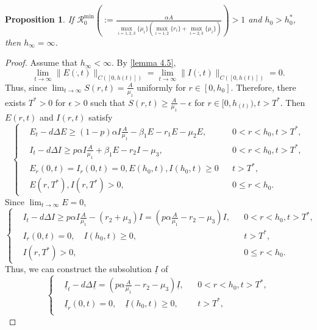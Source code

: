 \documentclass[11pt]{amsart}
\numberwithin{equation}{section}
\theoremstyle{plain}
\newtheorem{proposition}[theorem]{Proposition}
\theoremstyle{definition}
\begin{document}
\begin{proposition}
	If $\mathcal{R}_0^{\min}\left(:=\frac{\alpha A}{\max\limits_{i=1,2,3}\{\mu_i\}(\max\limits_{i=1,2}\{r_i\}+\max\limits_{i=2,3}\{\mu_i\})}\right)>1$ and $h_0>h_0^*$, then $h_\infty = \infty$.
\end{proposition}
\begin{proof}
	Assume that $h_\infty < \infty$. By \cref{lemma 4.5},
	\begin{equation*}
		\lim_{t \to \infty}\lVert E(\dot,t)\rVert_{C([0,h(t)])}=\lim_{t \to \infty}\lVert I(\dot,t)\rVert_{C([0,h(t)])}=0.
	\end{equation*}
	Thus, since $\displaystyle \lim_{t\to \infty}S(r,t)=\frac{A}{\mu_1}$ uniformly for $r \in [0,h_0]$. Therefore, there exists $T^*>0$ for $\epsilon>0$ such that $\displaystyle S(r,t) \geq \frac{A}{\mu_1}-\epsilon$ for $r\in [0,h_(t)), t>T^*$. Then $E(r,t)$ and $I(r,t)$ satisfy
	\begin{equation*}
		\left \{ \begin{aligned}
			&E_t-d\Delta E \geq (1-p)\alpha I \frac{A}{\mu_1}-\beta_1 E-r_1 E-\mu_2 E, \quad && 0<r<h_0, t>T^*,\\
			&I_t-d\Delta I \geq p \alpha I \frac{A}{\mu_1}+\beta_1 E-r_2 I-\mu_3, &&0<r<h_0, t>T^*,\\
			&E_r(0,t)=I_r(0,t)=0, E(h_0,t), I(h_0,t)\geq0 &&t>T^*,\\
			&E(r,T^*), I(r,T^*)>0, &&0\leq r <h_0.
		\end{aligned} \right.
	\end{equation*}
	Since $\displaystyle \lim_{t \to \infty} E=0$,
	\begin{equation*}
		\left \{ \begin{aligned}
			&I_t-d\Delta I \geq p \alpha I \frac{A}{\mu_1}-(r_2+\mu_3)I=(p\alpha \frac{A}{\mu_1}-r_2-\mu_3)I, &&0<r<h_0, t>T^*,\\
			&I_r(0,t)=0, \quad I(h_0,t)\geq 0, &&t>T^*,\\
			&I(r,T^*)>0, &&0\leq r < h_0.
		\end{aligned} \right.
	\end{equation*}
	Thus, we can construct the subsolution $\underline I$ of
	\begin{equation*}
		\left \{ \begin{aligned}
			&\underline I_t-d\Delta \underline I = (p\alpha \frac{A}{\mu_1}-r_2-\mu_3)\underline I, &&0<r<h_0, t>T^*,\\
			&\underline I_r(0,t)=0, \quad \underline I(h_0,t)\geq 0, &&t>T^*,\\

\end{aligned}
\end{equation*}
\end{proof}
\end{document}
